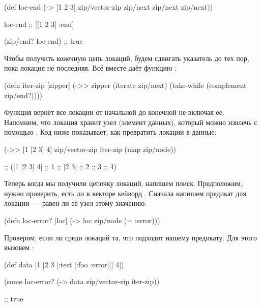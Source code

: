 \begin{english}
  \begin{clojure}
(def loc-end
  (-> [1 2 3]
      zip/vector-zip
      zip/next
      zip/next
      zip/next))

loc-end
;; [[1 2 3] :end]

(zip/end? loc-end)
;; true

  \end{clojure}
\end{english}

Чтобы получить конечную цепь локаций, будем сдвигать указатель до тех пор, пока
локация не последняя. Всё вместе даёт функцию :

\begin{english}
  \begin{clojure}
(defn iter-zip [zipper]
  (->> zipper
       (iterate zip/next)
       (take-while (complement zip/end?))))
  \end{clojure}
\end{english}

Функция вернёт все локации от начальной до конечной не включая ее. Напомним, что
локация хранит узел (элемент данных), который можно извлечь с помощью
. Код ниже показывает, как превратить локации в данные:

\begin{english}
  \begin{clojure}
(->> [1 [2 3] 4]
     zip/vector-zip
     iter-zip
     (map zip/node))

;; ([1 [2 3] 4]
;;  1
;;  [2 3]
;;  2
;;  3
;;  4)
  \end{clojure}
\end{english}

Теперь когда мы получили цепочку локаций, напишем поиск. Предположим, нужно
проверить, есть ли в векторе кейворд . Сначала напишем предикат для
локации~--- равен ли её узел этому значению:

\begin{english}
  \begin{clojure}
(defn loc-error? [loc]
  (-> loc zip/node (= :error)))
  \end{clojure}
\end{english}

Проверим, если ли среди локаций та, что подходит нашему предикату.  Для этого
вызовем :

\begin{english}
  \begin{clojure}
(def data [1 [2 3 [:test [:foo :error]]] 4])

(some loc-error?
      (-> data zip/vector-zip iter-zip))

;; true
  \end{clojure}
\end{english}

